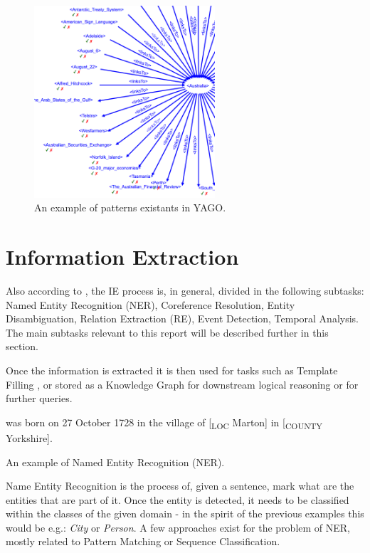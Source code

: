 \documentclass[11pt,a4paper,openright]{memoir}
\begin{document}
\begin{figure}[!htbp]
  \centering
    \includegraphics[width=0.6\textwidth]{./images/yago}
  \caption[An example of patterns existants in YAGO.]{An example of patterns existants in YAGO.}
  \label{fig:yago_examples}
\end{figure}

\section{Information Extraction}

Also according to \cite{Jurafsky:2000:SLP:555733}, the IE process is, in general, divided in the following subtasks: Named Entity Recognition (NER), Coreference Resolution, Entity Disambiguation, Relation Extraction (RE), Event Detection, Temporal Analysis. The main subtasks relevant to this report will be described further in this section.

Once the information is extracted it is then used for tasks such as Template Filling \cite{Jurafsky:2000:SLP:555733}, or stored as a Knowledge Graph for downstream logical reasoning or for further queries.

\begin{table}[!htbp]
  \centering
   was born on 27 October 1728 in the village of [\textsubscript{LOC} Marton] in [\textsubscript{COUNTY} Yorkshire].
  \caption[An example of NER.]{An example of Named Entity Recognition (NER).}
  \label{tab:james_cook}
\end{table}

Name Entity Recognition is the process of, given a sentence, mark what are the entities that are part of it. Once the entity is detected, it needs to be classified within the classes of the given domain - in the spirit of the previous examples this would be e.g.: \emph{City} or \emph{Person}. A few approaches exist for the problem of NER, mostly related to Pattern Matching or Sequence Classification.
\end{document}

